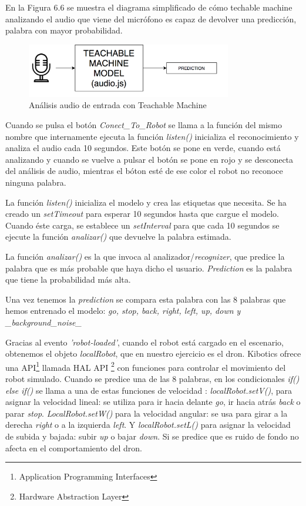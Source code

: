 En la Figura 6.6 se muestra el diagrama simplificado de cómo techable machine analizando el audio que viene del micrófono es capaz de devolver una predicción, palabra con mayor probabilidad.
\begin{figure}[H]
    \centering
    \includegraphics[width=0.8\textwidth, height=0.25\textwidth]{chapters/images/diagrama2.png}
    \caption{Análisis audio de entrada con Teachable Machine}
    \label{fig:my_label}
\end{figure}

Cuando se pulsa el botón \textit{Conect\_To\_Robot} se llama a la función del mismo nombre que internamente ejecuta  la función \textit{listen()}  inicializa el reconocimiento y analiza el audio cada 10 segundos.
Este botón se pone en verde, cuando está analizando y cuando se vuelve a pulsar el botón se pone en rojo y se desconecta del análisis de audio, mientras el bóton esté de ese color el robot no reconoce ninguna palabra.

La función \textit{listen()} inicializa el modelo y crea las etiquetas que necesita. Se ha creado un \textit{setTimeout} para esperar 10 segundos hasta que cargue el modelo. Cuando éste carga, se establece un \textit{setInterval} para que cada 10 segundos se ejecute la función \textit{analizar()} que devuelve la palabra estimada.

La función \textit{analizar()} es la que invoca al analizador/\textit{recognizer}, que predice la palabra que es más probable que haya dicho el usuario.  \textit{Prediction} es la palabra que tiene la probabilidad más alta.  

Una vez tenemos la \textit{prediction} se compara esta palabra con las 8 palabras que hemos entrenado el modelo: \textit{go, stop, back, right, left, up, down y \_background\_noise\_}

Gracias al evento \textit{'robot-loaded'}, cuando el robot está cargado en el escenario, obtenemos el objeto \textit{localRobot}, que en nuestro ejercicio es el dron. Kibotics ofrece una API\footnote{Application Programming Interfaces} llamada HAL API \footnote{Hardware Abstraction Layer} con funciones para controlar el movimiento del robot simulado. Cuando se predice una de las 8 palabras, en los condicionales \textit{if(){} else if() {}} se llama a una de estas funciones de velocidad : \textit{localRobot.setV()}, para asignar la velocidad lineal: se utiliza para ir hacia delante \textit{go}, ir hacia atrás \textit{back} o parar \textit{stop}.  \textit{LocalRobot.setW()} para la velocidad angular: se usa para girar a la derecha \textit{right} o a la izquierda \textit{left}. Y \textit{localRobot.setL()} para asignar la velocidad de subida y bajada: subir \textit{up} o bajar \textit{down}. Si se predice que es ruido de fondo no afecta en el comportamiento del dron.

